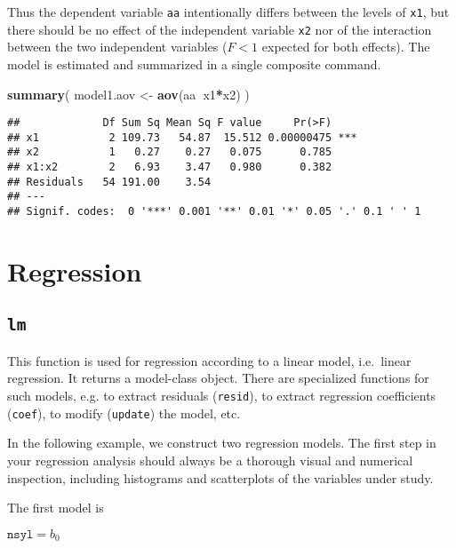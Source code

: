 \documentclass[]{book}
\newenvironment{Shaded}{\begin{snugshade}}{\end{snugshade}}
\newcommand{\KeywordTok}[1]{\textcolor[rgb]{0.13,0.29,0.53}{\textbf{#1}}}
\newcommand{\NormalTok}[1]{#1}
\newcommand{\OperatorTok}[1]{\textcolor[rgb]{0.81,0.36,0.00}{\textbf{#1}}}
\newcommand{\StringTok}[1]{\textcolor[rgb]{0.31,0.60,0.02}{#1}}
\begin{document}
Thus the dependent variable \texttt{aa} intentionally differs between the levels of \texttt{x1}, but there should be no effect of the independent variable \texttt{x2} nor of the interaction between the two independent variables (\(F<1\) expected for both effects). The model is estimated and summarized in a single composite command.

\begin{Shaded}
\begin{Highlighting}[]
\KeywordTok{summary}\NormalTok{( model1.aov <-}\StringTok{ }\KeywordTok{aov}\NormalTok{(aa}\OperatorTok{~}\NormalTok{x1}\OperatorTok{*}\NormalTok{x2) )}
\end{Highlighting}
\end{Shaded}

\begin{verbatim}
##             Df Sum Sq Mean Sq F value     Pr(>F)    
## x1           2 109.73   54.87  15.512 0.00000475 ***
## x2           1   0.27    0.27   0.075      0.785    
## x1:x2        2   6.93    3.47   0.980      0.382    
## Residuals   54 191.00    3.54                       
## ---
## Signif. codes:  0 '***' 0.001 '**' 0.01 '*' 0.05 '.' 0.1 ' ' 1
\end{verbatim}

\hypertarget{ch:regression}{%
\chapter{Regression}\label{ch:regression}}

\hypertarget{lm}{%
\section{\texorpdfstring{\texttt{lm}}{lm}}\label{lm}}

This function is used for regression according to a linear model,
i.e.~linear regression. It returns a model-class object. There are
specialized functions for such models, e.g.
to extract residuals (\texttt{resid}),
to extract regression coefficients (\texttt{coef}),
to modify (\texttt{update}) the model, etc.

In the following example, we construct two regression models.
The first step in your regression analysis should always be a thorough visual and numerical inspection, including histograms and scatterplots of the variables under
study.

The first model is

\(\texttt{nsyl} = b_0\)
\end{document}
